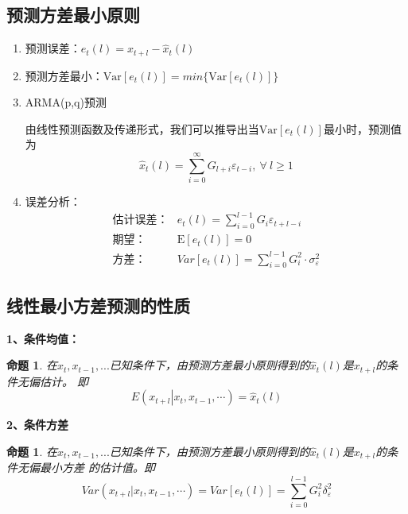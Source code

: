 \documentclass[12pt, a4paper, oneside]{ctexbook}
\newtheorem{proposition}[theorem]{命题}
\begin{document}
\subsection{预测方差最小原则}
\begin{enumerate}[1、]
    \item 预测误差：$e_t(l) = x_{t+l} - \hat{x}_t(l)$
    \item 预测方差最小：$\mathrm{Var}[e_t(l)] = min\{\mathrm{Var}[e_t(l)]\}$
    \item ARMA(p,q)预测

          由线性预测函数及传递形式，我们可以推导出当$\mathrm{Var}[e_t(l)]$最小时，预测值为
          \begin{equation}
              \hat{x}_t(l) = \sum_{i = 0}^{\infty}G_{l+i}\varepsilon_{t-i},~\forall ~l\geq 1
          \end{equation}
    \item 误差分析：
          \begin{equation}
              \begin{aligned}
                  \text{估计误差：} & e_t(l) = \sum_{i = 0}^{l-1}G_{i}\varepsilon_{t+l-i}        \\
                  \text{期望：}   & \mathrm{E}[e_t(l)] = 0                                     \\
                  \text{方差：}   & Var[e_t(l)]=\sum_{i=0}^{l-1}G_i^2\cdot\sigma_\varepsilon^2
              \end{aligned}
          \end{equation}
\end{enumerate}

\subsection{线性最小方差预测的性质}
\textbf{1、条件均值：}
\begin{proposition}
    在$x_t,x_{t-1},...$已知条件下，由预测方差最小原则得到的$\hat{x}_t(l)$是$x_{t+l}$的条件无偏估计。
    即
    \begin{equation}
        \left.E\left(x_{t+l}\right|x_{t},x_{t-1},\cdots\right)=\hat{x}_t(l)
    \end{equation}
\end{proposition}

\textbf{2、条件方差}

\begin{proposition}
    在$x_t,x_{t-1},...$已知条件下，由预测方差最小原则得到的$\hat{x}_t(l)$是$x_{t+l}$的条件无偏最小方差
    的估计值。即
    \begin{equation}
        Var(x_{t+l}|x_t,x_{t-1},\cdots)=Var[e_t(l)] = \sum_{i=0}^{l-1} G_{i}^{2}\delta_{\varepsilon}^2
    \end{equation}
\end{proposition}
\end{document}
